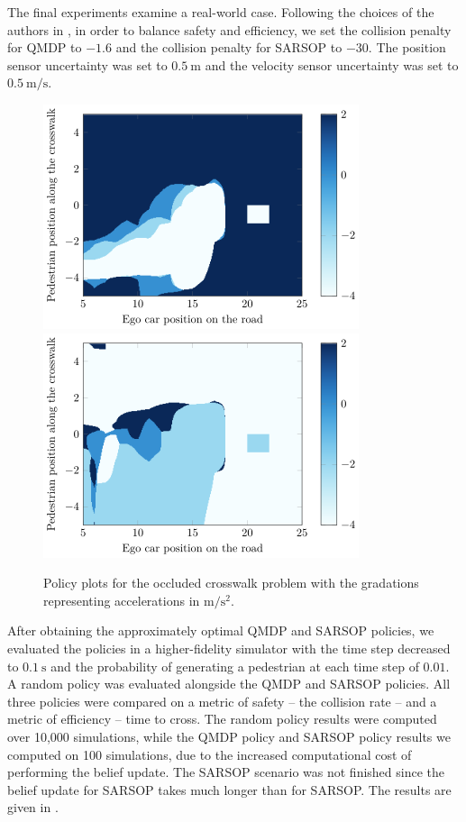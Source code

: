 \documentclass[conference]{IEEEtran}
\begin{document}
The final experiments examine a real-world case. Following the choices of the authors in \cite{Bouton2018ScalableDriving}, in order to balance safety and efficiency, we set the collision penalty for QMDP to $-1.6$ and the collision penalty for SARSOP to $-30$. The position sensor uncertainty was set to $0.5 ~\si{\meter}$ and the velocity sensor uncertainty was set to $0.5 ~\si{\meter\per\second}$.

\begin{figure}[tbph]
    \centerline{
        \includegraphics[width=0.5\linewidth]{src/plots/qmdpSIM_0_00001_noise_05.png}
        \includegraphics[width=0.5\linewidth]{src/plots/sarsopSIM_0_01_1000_noise_05.png}
    }
    \caption{Policy plots for the occluded crosswalk problem with the gradations representing accelerations in $\si{\meter\per\square\second}$. }
    \label{fig:qmdp_sarsop_1}
\end{figure}

After obtaining the approximately optimal QMDP and SARSOP policies, we evaluated the policies in a higher-fidelity simulator with the time step decreased to $0.1 ~\si{\second}$ and the probability of generating a pedestrian at each time step of $0.01$. A random policy was evaluated alongside the QMDP and SARSOP policies. All three policies were compared on a metric of safety -- the collision rate -- and a metric of efficiency -- time to cross. The random policy results were computed over 10,000 simulations, while the QMDP policy and SARSOP policy results we computed on 100 simulations, due to the increased computational cost of performing the belief update. The SARSOP scenario was not finished since the belief update for SARSOP takes much longer than for SARSOP. The results are given in .
\end{document}
